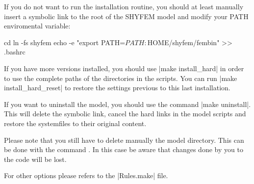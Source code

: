 If you do not want to run the installation routine, you should at least
manually insert a symbolic link to the root of the SHYFEM model and
modify your PATH enviromental variable:

\begin{codem}
    cd
    ln -fs \shydir shyfem
    echo -e "export PATH=$PATH:$HOME/shyfem/fembin" >> .bashrc
\end{codem}

If you have more versions installed, you should use |make install_hard|
in order to use the complete paths of the directories in the scripts.
You can run |make install_hard_reset| to restore the settings previous to
this last installation.

If you want to uninstall the model, you should use the command
|make uninstall|. This will delete the symbolic link, cancel the hard
links in the model scripts and restore the systemfiles \ttt{\sysfiles}
to their original content.

Please note that you still have to delete manually the model
directory. This can be done with the command . 
In this case be aware
that changes done by you to the code will be lost.

For other options please refers to the |Rules.make| file.



